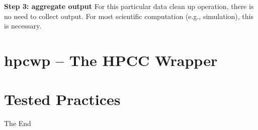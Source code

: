\documentclass{beamer}
\begin{document}

\begin{frame}
\textbf{Step 3: aggregate output}
For this particular data clean up operation, there is no need to collect output. For most scientific
computation (e.g., simulation), this is necessary.
\end{frame}

\section{hpcwp -- The HPCC Wrapper}


\section{Tested Practices}

\begin{frame}
\Huge{\centerline{The End}}
\end{frame}

\end{document}
